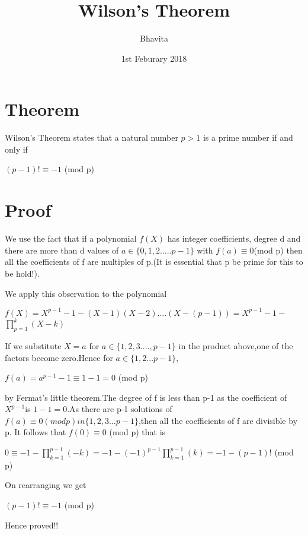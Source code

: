 \documentclass{article}
\title{Wilson's Theorem}
\author{Bhavita}
\date{1st Feburary 2018}
\begin{document}
\maketitle

\section{Theorem}
Wilson's Theorem states that a natural number $ p>1 $ is a prime number if and only if 

       $ (p-1)!\equiv-1$   (mod p)
       
\section{Proof} 
We use the fact that if a polynomial $f(X)$ has integer coefficients, degree d and there are more than d values of $a\in\{0,1,2.....p-1\}$
with $f(a)\equiv0$(mod p) then all the coefficients of f are 
multiples of p.(It is essential that p be prime for this to be hold!).

We apply this observation to the polynomial \newline
  
  
  $f(X)=X^{p-1}-1-(X-1)(X-2)....(X-(p-1))=X^{p-1}-1-$$\prod_{p=1}^{k}(X-k)$\newline
  
  
If we substitute $X=a$ for $a\in\{1,2,3....,p-1\}$ in the product above,one of the factors become zero.Hence for $ a\in\{1,2...p-1\}$, \newline
  
  
  $f(a)=a^{p-1}-1 \equiv 1-1=0 $  (mod p) \newline
  
  
by Fermat's little theorem.The degree of f is less than p-1 as the coefficient of $X^{p-1}$is $1-1=0$.As there are p-1 solutions of $f(a)\equiv 0 (mod p) in \{1,2,3...p-1\}$,then all the coefficients 
of f are divisible by p. It follows that $f(0)\equiv0$ (mod p) that is \newline
  
  $0\equiv-1-\prod_{k=1}^{p-1}(-k)=-1-(-1)^{p-1}\prod_{k=1}^{p-1}(k)=-1-(p-1)!$ (mod p) \newline
  
On rearranging we get \newline
  
  $(p-1)!\equiv-1$ (mod p) \newline
  
   Hence proved!!
  
\end{document}
